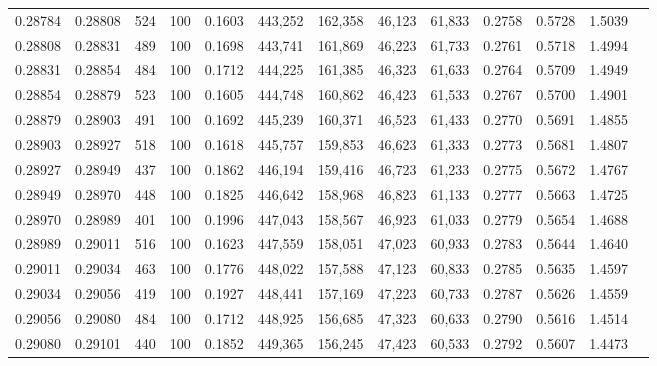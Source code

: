 \begin{tabular}{rrrrrrrrrrrrr}
0.28784 & 0.28808 &   524 & 100 &                                     0.1603 & 443,252 & 162,358 &  46,123 &  61,833 & 0.2758 & 0.5728 & 1.5039 \\
0.28808 & 0.28831 &   489 & 100 &                                     0.1698 & 443,741 & 161,869 &  46,223 &  61,733 & 0.2761 & 0.5718 & 1.4994 \\
0.28831 & 0.28854 &   484 & 100 &                                     0.1712 & 444,225 & 161,385 &  46,323 &  61,633 & 0.2764 & 0.5709 & 1.4949 \\
0.28854 & 0.28879 &   523 & 100 &                                     0.1605 & 444,748 & 160,862 &  46,423 &  61,533 & 0.2767 & 0.5700 & 1.4901 \\
0.28879 & 0.28903 &   491 & 100 &                                     0.1692 & 445,239 & 160,371 &  46,523 &  61,433 & 0.2770 & 0.5691 & 1.4855 \\
0.28903 & 0.28927 &   518 & 100 &                                     0.1618 & 445,757 & 159,853 &  46,623 &  61,333 & 0.2773 & 0.5681 & 1.4807 \\
0.28927 & 0.28949 &   437 & 100 &                                     0.1862 & 446,194 & 159,416 &  46,723 &  61,233 & 0.2775 & 0.5672 & 1.4767 \\
0.28949 & 0.28970 &   448 & 100 &                                     0.1825 & 446,642 & 158,968 &  46,823 &  61,133 & 0.2777 & 0.5663 & 1.4725 \\
0.28970 & 0.28989 &   401 & 100 &                                     0.1996 & 447,043 & 158,567 &  46,923 &  61,033 & 0.2779 & 0.5654 & 1.4688 \\
0.28989 & 0.29011 &   516 & 100 &                                     0.1623 & 447,559 & 158,051 &  47,023 &  60,933 & 0.2783 & 0.5644 & 1.4640 \\
0.29011 & 0.29034 &   463 & 100 &                                     0.1776 & 448,022 & 157,588 &  47,123 &  60,833 & 0.2785 & 0.5635 & 1.4597 \\
0.29034 & 0.29056 &   419 & 100 &                                     0.1927 & 448,441 & 157,169 &  47,223 &  60,733 & 0.2787 & 0.5626 & 1.4559 \\
0.29056 & 0.29080 &   484 & 100 &                                     0.1712 & 448,925 & 156,685 &  47,323 &  60,633 & 0.2790 & 0.5616 & 1.4514 \\
0.29080 & 0.29101 &   440 & 100 &                                     0.1852 & 449,365 & 156,245 &  47,423 &  60,533 & 0.2792 & 0.5607 & 1.4473 \\

\end{tabular}
